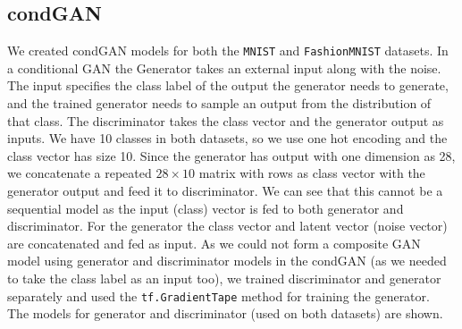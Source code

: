 \documentclass[conference]{IEEEtran}
\begin{document}
\subsection{condGAN}
We created condGAN models for both the \texttt{MNIST} and \texttt{FashionMNIST} datasets. In a conditional GAN the Generator takes an external input along with the noise. The input specifies the class label of the output the generator needs to generate, and the trained generator needs to sample an output from the distribution of that class. The discriminator takes the class vector and the generator output as inputs. We have 10 classes in both datasets, so we use one hot encoding and the class vector has size 10. Since the generator has output with one dimension as 28, we concatenate a repeated $28\times 10$ matrix with rows as class vector with the generator output and feed it to discriminator. We can see that this cannot be a sequential model as the input (class) vector is fed to both generator and discriminator. For the generator the class vector and latent vector (noise vector) are concatenated and fed as input. As we could not form a composite GAN model using generator and discriminator models in the condGAN (as we needed to take the class label as an input too), we trained discriminator and generator separately and used the \texttt{tf.GradientTape} method for training the generator.\\
The models for generator and discriminator (used on both datasets) are shown.
\end{document}
